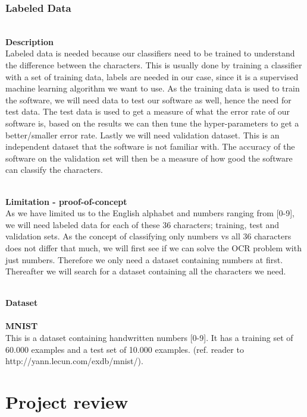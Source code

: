 \documentclass[11pt,a4paper,UKenglish]{article}
\begin{document}
\subsubsection{Labeled Data}
\noindent \\ \textbf{Description}
\noindent \\
Labeled data is needed because our classifiers need to be trained to understand
the difference between the characters. This is usually done by training a
classifier with a set of training data, labels are needed in our case,
since it is a supervised machine learning algorithm we want to use. As the
training data is used to train the software, we will need data to test our
software as well, hence the need for test data. The test data is used to get a
measure of what the error rate of our software is, based on the results we
can then tune the hyper-parameters to get a better/smaller error rate. Lastly
we will need validation dataset. This is an independent dataset that the software
is not familiar with. The accuracy of the software on the validation set will
then be a measure of how good the software can classify the characters.

\noindent \\ \textbf{Limitation - proof-of-concept}
\noindent \\
As we have limited us to the English alphabet and numbers ranging from [0-9],
we will need labeled data for each of these 36 characters; training, test and
validation sets. As the concept of classifying only numbers vs all 36
characters does not differ that much, we will first see if we can solve the OCR
problem with just numbers. Therefore we only need a dataset containing numbers
at first. Thereafter we will search for a dataset containing all the characters
we need.

\noindent \\ \textbf{Dataset}
\noindent \\
\noindent \\ \textbf{MNIST}
\noindent \\ This is a dataset containing handwritten numbers [0-9].
It has a training set of 60.000 examples and a test set of 10.000 examples.
(ref. reader to http://yann.lecun.com/exdb/mnist/).


\newpage
\section{Project review}
\label{sec:Project review}
\end{document}
